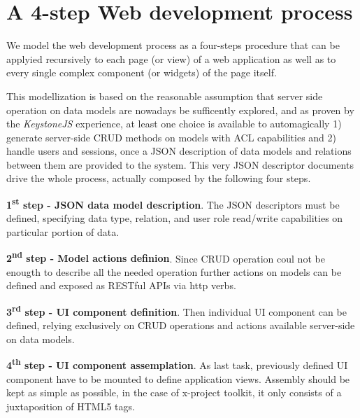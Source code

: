 \section{A 4-step Web development process}\label{sec:dev-proc}

We model the web development process as a four-steps procedure that can be
applyied recursively to each page (or view) of a web application as well as to
every single complex component (or widgets) of the page itself.

This modellization is based on the reasonable assumption that server side
operation on data models are nowadays be sufficently explored, and as proven by
the {\em KeystoneJS} experience, at least one choice is available to automagically  
1) generate server-side CRUD methods on models with ACL capabilities and 
2) handle users and sessions, 
once a JSON description of data models and relations between them are provided to the
system. This very JSON descriptor documents drive the whole process, actually composed
by the following four steps.


{\bf 1\textsuperscript{st} step - JSON data model description}. The JSON
descriptors must be defined, specifying data type, relation, and user role
read/write capabilities on particular portion of data.

{\bf 2\textsuperscript{nd} step - Model actions definion}. Since CRUD
operation coul not be enougth to describe all the needed operation further
actions on models can be defined and exposed as RESTful APIs via http verbs.

{\bf 3\textsuperscript{rd} step - UI component definition}. Then individual UI
component can be defined,  relying exclusively on CRUD operations and actions
available server-side on data models.

{\bf 4\textsuperscript{th} step - UI component assemplation}. As last task,
previously defined UI component  have to be mounted to define application
views. Assembly should be kept as simple as possible, in the case of x-project
toolkit, it only consists of a juxtaposition of HTML5 tags.



